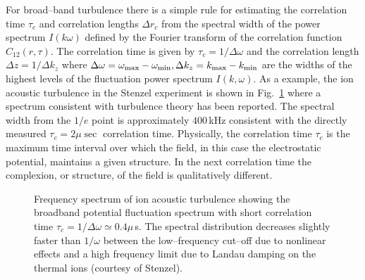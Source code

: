 \documentclass[a4paper,openany,12pt]{book}
\begin{document}
For broad--band turbulence there is a simple rule for estimating the correlation time $\tau_c$ and correlation lengths $\Delta r_c$ from the spectral width of the power spectrum $I(k\omega)$ defined by the Fourier transform of the correlation function $C_{12}(r, \tau)$. The correlation time is given by $\tau_c=1/\Delta\omega$ and the correlation length $\Delta z=1/\Delta k_z$ where $\Delta\omega=\omega_{\rm max}-\omega_{\rm min}, \Delta k_z=k_{\rm max}-k_{\rm min}$ are the widths of the highest levels of the fluctuation power spectrum $I(k, \omega)$. As a example, the ion acoustic turbulence in the Stenzel experiment is shown in Fig.~\ref{F9.3} where a spectrum consistent with turbulence theory has been reported. The spectral width from the $1/e$ point is approximately $400\,$kHz consistent with the directly measured $\tau_c=2\mu\sec$ correlation time. Physically, the correlation time $\tau_c$ is the maximum time interval over which the field, in this case the electrostatic potential, maintains a given structure. In the next correlation time the complexion, or structure, of the field is qualitatively different.
%
\begin{figure}[H]
\centerline{}
\caption{Frequency spectrum of ion acoustic turbulence showing the broadband potential fluctuation spectrum with short correlation time $\tau_c=1/\Delta\omega\simeq 0.4\mu\,$s. The spectral distribution decreases slightly faster than $1/\omega$ between the low--frequency cut--off due to nonlinear effects and a high frequency limit due to Landau damping on the thermal ions (courtesy of Stenzel).}
\label{F9.3}
\end{figure}
%
\end{document}
